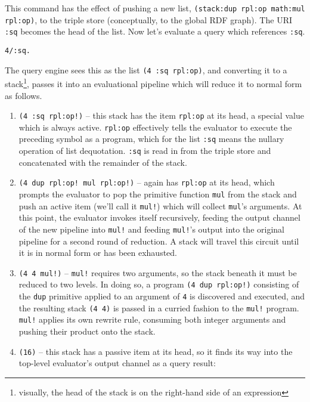 \documentclass[runningheads]{llncs}
\begin{document}
This command has the effect of pushing a new list, \texttt{(stack:dup rpl:op math:mul rpl:op)}, to the triple store (conceptually, to the global RDF graph).  The URI \texttt{:sq} becomes the head of the list.  Now let's evaluate a query which references \texttt{:sq}.

\begin{verbatim}
4/:sq.
\end{verbatim}

The query engine sees this as the list \texttt{(4 :sq rpl:op)}, and converting it to a stack\footnote{visually, the head of the stack is on the right-hand side of an expression}, passes it into an evaluational pipeline which will reduce it to normal form as follows.

\begin{enumerate}
\item \texttt{(4 :sq rpl:op!)} -- this stack has the item \texttt{rpl:op} at its head, a special value which is always active.  \texttt{rpl:op} effectively tells the evaluator to execute the preceding symbol as a program, which for the list \texttt{:sq} means the nullary operation of list dequotation.  \texttt{:sq} is read in from the triple store and concatenated with the remainder of the stack.
\item \texttt{(4 dup rpl:op! mul rpl:op!)} -- again has \texttt{rpl:op} at its head, which prompts the evaluator to pop the primitive function \texttt{mul} from the stack and push an active item (we'll call it \texttt{mul!}) which will collect \texttt{mul}'s arguments.  At this point, the evaluator invokes itself recursively, feeding the output channel of the new pipeline into \texttt{mul!} and feeding \texttt{mul!}'s output into the original pipeline for a second round of reduction.  A stack will travel this circuit until it is in normal form or has been exhausted.
\item \texttt{(4 4 mul!)} -- \texttt{mul!} requires two arguments, so the stack beneath it must be reduced to two levels.  In doing so, a program \texttt{(4 dup rpl:op!)} consisting of the \texttt{dup} primitive applied to an argument of \texttt{4} is discovered and executed, and the resulting stack \texttt{(4 4)} is passed in a curried fashion to the \texttt{mul!} program.  \texttt{mul!} applies its own rewrite rule, consuming both integer arguments and pushing their product onto the stack.
\item \texttt{(16)} -- this stack has a passive item at its head, so it finds its way into the top-level evaluator's output channel as a query result:
\end{enumerate}
\end{document}
